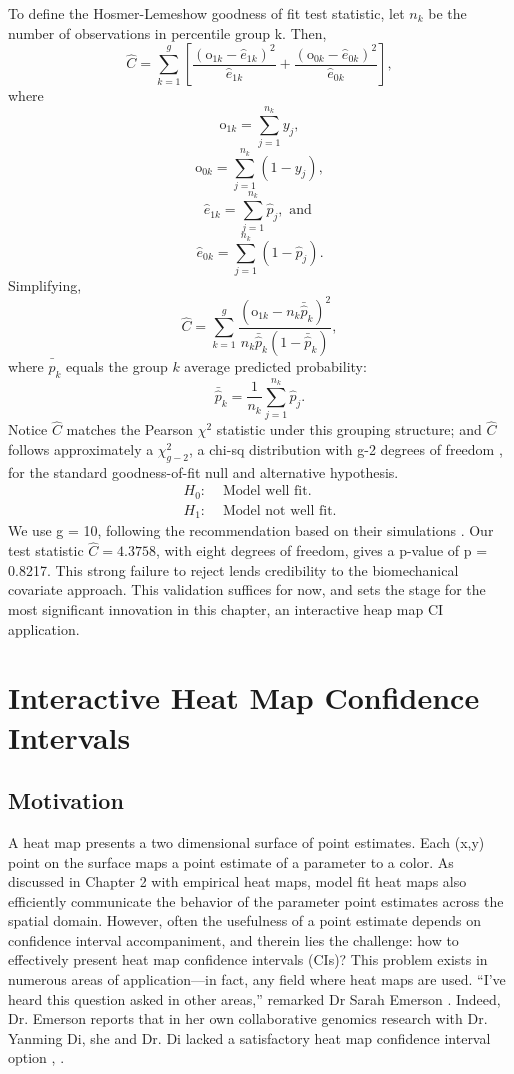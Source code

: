 To define the Hosmer-Lemeshow goodness of fit test statistic, let $n_{k}$ be the number of observations in percentile group k. Then,
$$ \widehat{C} = \sum_{k=1}^{g} \left[ \frac{(\text{o}_{1k}-\hat{e}_{1k})^{2}}{\hat{e}_{1k}} + \frac{(\text{o}_{0k}-\hat{e}_{0k})^{2}}{\hat{e}_{0k}}  \right], $$
where
$$ \text{o}_{1k} =  \sum_{j=1}^{n_{k}}y_{j},$$
$$ \text{o}_{0k} =  \sum_{j=1}^{n_{k}}(1-y_{j}),$$
$$ \hat{e}_{1k} = \sum_{j=1}^{n_{k}}\hat{p}_{j}, \text{ and }$$
$$ \hat{e}_{0k} = \sum_{j=1}^{n_{k}}(1-\hat{p}_{j}).$$
Simplifying, 
$$ \widehat{C} = \sum_{k=1}^{g} \frac{(\text{o}_{1k}-n_{k}\bar{\hat{p}}_{k})^{2}}{n_{k}\bar{\hat{p}}_{k}(1-\bar{\hat{p}}_{k})},$$
where $\bar{\hat{p}}_{k}$ equals the group $k$ average predicted probability:
$$\bar{\hat{p}}_{k} = \frac{1}{n_{k}}\sum_{j=1}^{n_{k}}\hat{p}_{j}.$$
Notice $\widehat{C}$ matches the Pearson $\chi^{2}$ statistic under this grouping structure; and $\widehat{C}$ follows approximately a $\chi^{2}_{g-2}$, a chi-sq distribution with g-2 degrees of freedom \citep{Hosmer1980}, for the standard goodness-of-fit null and alternative hypothesis.
\begin{align}
H_{0}: & \text{ Model well fit.} \\
H_{1}: & \text{ Model not well fit.}
\end{align}
We use g = 10, following the \cite{Hosmer2013} recommendation based on their simulations \cite{Hosmer1980}. Our test statistic $\widehat{C} = 4.3758$, with eight degrees of freedom, gives a p-value of p = 0.8217. This strong failure to reject lends credibility to the biomechanical covariate approach. This validation suffices for now, and sets the stage for the most significant innovation in this chapter, an interactive heap map CI application.

\section{Interactive Heat Map Confidence Intervals}

\subsection{Motivation}

A heat map presents a two dimensional surface of point estimates. Each (x,y) point on the surface maps a point estimate of a parameter to a color. As discussed in Chapter 2 with empirical heat maps, model fit heat maps also efficiently communicate the behavior of the parameter point estimates across the spatial domain. However, often the usefulness of a point estimate depends on confidence interval accompaniment, and therein lies the challenge: how to effectively present heat map confidence intervals (CIs)? This problem exists in numerous areas of application---in fact, any field where heat maps are used. ``I've heard this question asked in other areas,'' remarked Dr Sarah Emerson \citep{Emerson}. Indeed, Dr. Emerson reports that in her own collaborative genomics research with Dr. Yanming Di, she and Dr. Di lacked a satisfactory heat map confidence interval option \citep{Emerson}, \citep{Emerson2012}. 

